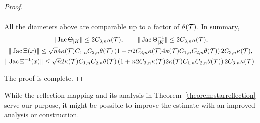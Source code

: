 \documentclass[10pt,letterpaper]{article}
\begin{document}
\begin{proof}
\begin{itemize}
\begin{align*}
        \end{align*}
        All the diameters above are comparable up to a factor of $\theta({\mathcal T})$.
        In summary,
        \begin{gather*}
            \| \Jacobian \Theta_{|K}      \| \leq 2 \Csechs{n} \kappa(\calT)
            ,
            \qquad 
            \| \Jacobian \Theta_{|K}^{-1} \| \leq 2 \Csechs{n} \kappa(\calT)
            ,
            \\
            \| \Jacobian \Xi(x) \|
            \leq 
            \sqrt{n}
            4 
            \kappa(\calT) 
            \Ceins{n} 
            \Czwei{n} 
            \theta(\calT) %
            \left( 
                1
                + 
                n
                2 \Csechs{n} \kappa(\calT)
                4 
                \kappa(\calT) 
                \Ceins{n} 
                \Czwei{n} 
                \theta(\calT) %
            \right) 
            2 \Csechs{n} \kappa(\calT)
            ,
            \\
            \| \Jacobian \Xi^{-1}(x) \|
            \leq 
            \sqrt{n}
            2 
            \kappa(\calT) 
            \Ceins{n} 
            \Czwei{n} 
            \theta(\calT) %
            \left( 
                1
                + 
                n
                2 \Csechs{n} \kappa(\calT)
                2 
                \kappa(\calT) 
                \Ceins{n} 
                \Czwei{n} 
                \theta(\calT) %
            \right) 
            2 \Csechs{n} \kappa(\calT)
            .
        \end{gather*}
    \end{itemize}
    The proof is complete. 
\end{proof}







\begin{remark}
    While the reflection mapping and its analysis in Theorem~\ref{theorem:starreflection} serve our purpose,
    it might be possible to improve the estimate with an improved analysis or construction.
\end{remark}
\end{document}
